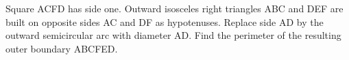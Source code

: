 Square ACFD has side one. Outward isosceles right triangles ABC and DEF are built on opposite sides AC and DF as hypotenuses. Replace side AD by the outward semicircular arc with diameter AD. Find the perimeter of the resulting outer boundary ABCFED.
